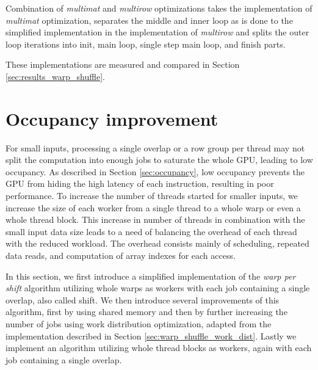 Combination of \textit{multimat} and \textit{multirow} optimizations takes the implementation of \textit{multimat} optimization, separates the middle and inner loop as is done to the simplified implementation in the implementation of \textit{multirow} and splits the outer loop iterations into init, main loop, single step main loop, and finish parts.

These implementations are measured and compared in Section \ref{sec:results_warp_shuffle}.

\section{Occupancy improvement}
\label{sec:occupancy_improvements}

For small inputs, processing a single overlap or a row group per thread may not split the computation into enough jobs to saturate the whole GPU, leading to low occupancy. As described in Section \ref{sec:occupancy}, low occupancy prevents the GPU from hiding the high latency of each instruction, resulting in poor performance. To increase the number of threads started for smaller inputs, we increase the size of each worker from a single thread to a whole warp or even a whole thread block. This increase in number of threads in combination with the small input data size leads to a need of balancing the overhead of each thread with the reduced workload. The overhead consists mainly of scheduling, repeated data reads, and computation of array indexes for each access. 


In this section, we first introduce a simplified implementation of the \textit{warp per shift} algorithm utilizing whole warps as workers with each job containing a single overlap, also called shift. We then introduce several improvements of this algorithm, first by using shared memory and then by further increasing the number of jobs using work distribution optimization, adapted from the implementation described in Section \ref{sec:warp_shuffle_work_dist}. Lastly we implement an algorithm utilizing whole thread blocks as workers, again with each job containing a single overlap.

